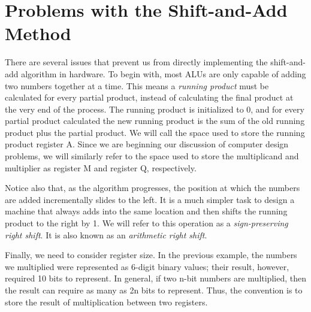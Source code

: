 \documentclass{article}
\begin{document}
\section{Problems with the Shift-and-Add Method}
There are several issues that prevent us from directly implementing the shift-and-add algorithm in hardware.
To begin with, most ALUs are only capable of adding two numbers together at a time.
This means a \emph{running product} must be calculated for every partial product, instead of calculating the final product at the very end of the process.
The running product is initialized to 0, and for every partial product calculated the new running product is the sum of the old running product plus the partial product.
We will call the space used to store the running product register A.
Since we are beginning our discussion of computer design problems, we will similarly refer to the space used to store the multiplicand and multiplier as register M and register Q, respectively.

Notice also that, as the algorithm progresses, the position at which the numbers are added incrementally slides to the left.
It is a much simpler task to design a machine that always adds into the same location and then shifts the running product to the right by 1.
We will refer to this operation as a \emph{sign-preserving right shift}.
It is also known as an \emph{arithmetic right shift}.

Finally, we need to consider register size.
In the previous example, the numbers we multiplied were represented as 6-digit binary values; their result, however, required 10 bits to represent.
In general, if two n-bit numbers are multiplied, then the result can require as many as 2n bits to represent.
Thus, the convention is to store the result of multiplication between two registers.
\end{document}
